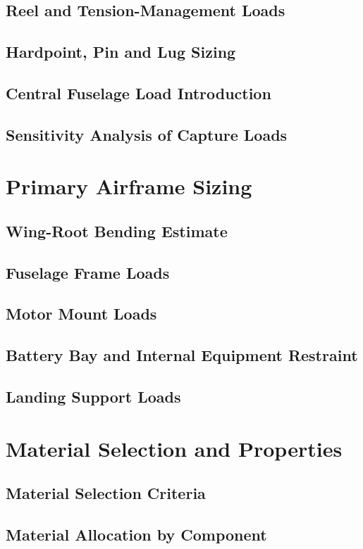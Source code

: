 \subsection{Reel and Tension-Management Loads}
\subsection{Hardpoint, Pin and Lug Sizing}
\subsection{Central Fuselage Load Introduction}
\subsection{Sensitivity Analysis of Capture Loads}


\section{Primary Airframe Sizing}
\subsection{Wing-Root Bending Estimate}
\subsection{Fuselage Frame Loads}
\subsection{Motor Mount Loads}
\subsection{Battery Bay and Internal Equipment Restraint}
\subsection{Landing Support Loads}


\section{Material Selection and Properties}
\subsection{Material Selection Criteria}
\subsection{Material Allocation by Component}
